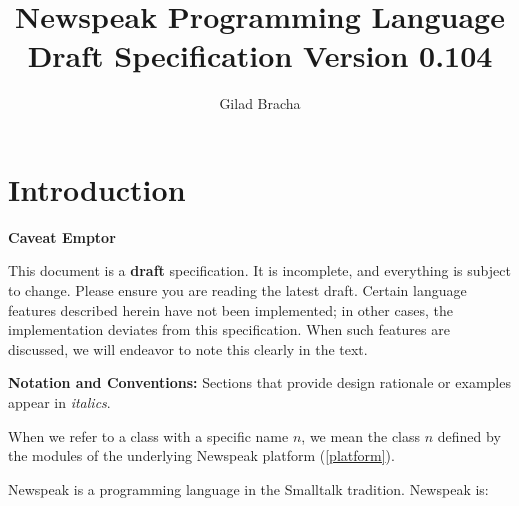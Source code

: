 \documentclass{article}
\title{Newspeak Programming Language Draft Specification Version 0.104}
\author{Gilad Bracha}
\begin{document}
\maketitle
\tableofcontents

\section{Introduction}

{\em

 {\bf Caveat Emptor}
 
This document is a {\bf  draft} specification. It is incomplete, and everything is subject to change. Please ensure you are reading the latest draft. Certain language features described herein have not been implemented; in other cases, the implementation deviates from this specification. When such features are discussed, we will endeavor to note this clearly in the text.

}


{\bf Notation and Conventions:} Sections that provide design rationale or examples appear in {\em italics}. 

When we refer to a class with a specific name $n$, we mean the class $n$ defined by the modules of the underlying Newspeak platform (\ref{platform}).

Newspeak is a programming language in the Smalltalk \cite{GoldbergRobson83} tradition.  
Newspeak is:
\end{document}
